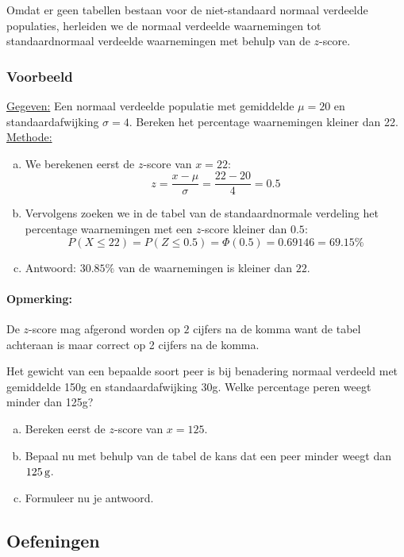 \documentclass[a4paper,12pt, twoside]{article}
\begin{document}
Omdat er geen tabellen bestaan voor de niet-standaard normaal verdeelde populaties, herleiden we de normaal verdeelde waarnemingen tot standaardnormaal verdeelde waarnemingen met behulp van de $z$-score.

\subsubsection*{Voorbeeld}

\underline{Gegeven:} Een normaal verdeelde populatie met gemiddelde $\mu=20$ en standaardafwijking $\sigma=4$. Bereken het percentage waarnemingen kleiner dan 22.\\
\underline{Methode:}
\begin{enumerate}[(a)]
  \item We berekenen eerst de $z$-score van $x=22$:
  $$z=\dfrac{x-\mu}{\sigma}=\dfrac{22-20}{4}=0.5$$
  \item Vervolgens zoeken we in de tabel van de standaardnormale verdeling het percentage waarnemingen met een $z$-score kleiner dan $0.5$:
  $$P(X\leq 22)=P(Z\leq 0.5)=\Phi(0.5)=0.69146=69.15\%$$
  \item Antwoord: $30.85\%$ van de waarnemingen is kleiner dan $22$.
\end{enumerate}

\paragraph*{Opmerking: } De $z$-score mag afgerond worden op $2$ cijfers na de komma want de tabel achteraan is maar correct op 2 cijfers na de komma.

\begin{oefening}
Het gewicht van een bepaalde soort peer is bij benadering normaal verdeeld met gemiddelde 150g en standaardafwijking 30g.
Welke percentage peren weegt minder dan 125g?
\begin{enumerate}[(a)]
  \item Bereken eerst de $z$-score van $x=125$.
  \item Bepaal nu met behulp van de tabel de kans dat een peer minder weegt dan $125\g$.
  \item Formuleer nu je antwoord.
\end{enumerate}
\end{oefening}

\subsection{Oefeningen}
\end{document}
